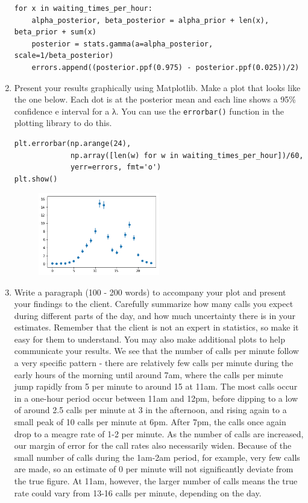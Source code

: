 \documentclass[11pt]{report}
\begin{document}
\begin{enumerate}
\begin{verbatim}
for x in waiting_times_per_hour:
    alpha_posterior, beta_posterior = alpha_prior + len(x), beta_prior + sum(x)
    posterior = stats.gamma(a=alpha_posterior, scale=1/beta_posterior)
    errors.append((posterior.ppf(0.975) - posterior.ppf(0.025))/2) \end{verbatim}
    \item Present your results graphically using Matplotlib. Make a plot that looks like the one below. Each dot is at the posterior mean and each line shows a 95\% confidence e interval for a λ. You can use the \texttt{errorbar()} function in the plotting library to do this. 
    \begin{verbatim}
plt.errorbar(np.arange(24), 
             np.array([len(w) for w in waiting_times_per_hour])/60, 
             yerr=errors, fmt='o')
plt.show()
	\end{verbatim}
\begin{figure}[H]
  \centering
    \includegraphics[width=0.5\textwidth]{confint.png}
    \end{figure}
    \item Write a paragraph (100 - 200 words) to accompany your plot and present your findings to the client. Carefully summarize how many calls you expect during different parts of the day, and how much uncertainty there is in your estimates. Remember that the client is not an expert in statistics, so make it easy for them to understand. You may also make additional plots to help communicate your results. \newpage We see that the number of calls per minute follow a very specific pattern - there are relatively few calls per minute during the early hours of the morning until around 7am, where the calls per minute jump rapidly from 5 per minute to around 15 at 11am. The most calls occur in a one-hour period occur between 11am and 12pm, before dipping to a low of around 2.5 calls per minute at 3 in the afternoon, and rising again to a small peak of 10 calls per minute at 6pm. After 7pm, the calls once again drop to a meagre rate of 1-2 per minute. As the number of calls are increased, our margin of error for the call rates also necessarily widen. Because of the small number of calls during the 1am-2am period, for example, very few calls are made, so an estimate of 0 per minute will not significantly deviate from the true figure. At 11am, however, the larger number of calls means the true rate could vary from 13-16 calls per minute, depending on the day.
\end{enumerate}
\end{document}
